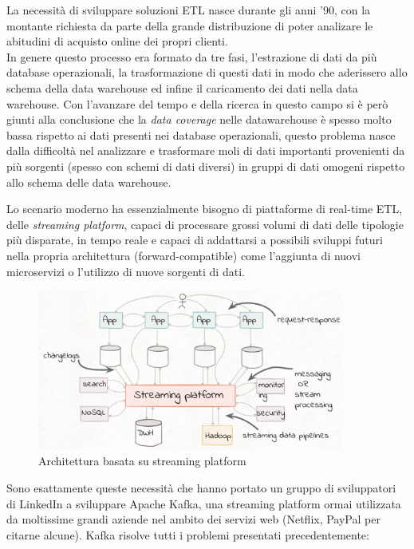\documentclass[]{article}
\begin{document}
La necessità di sviluppare soluzioni ETL nasce durante gli anni '90, con
la montante richiesta da parte della grande distribuzione di poter
analizare le abitudini di acquisto online dei propri clienti.\\
In genere questo processo era formato da tre fasi, l'estrazione di dati
da più database operazionali, la trasformazione di questi dati in modo
che aderissero allo schema della data warehouse ed infine il caricamento
dei dati nella data warehouse. Con l'avanzare del tempo e della ricerca
in questo campo si è però giunti alla conclusione che la \emph{data
coverage} nelle datawarehouse è spesso molto bassa rispetto ai dati
presenti nei database operazionali, questo problema nasce dalla
difficoltà nel analizzare e trasformare moli di dati importanti
provenienti da più sorgenti (spesso con schemi di dati diversi) in
gruppi di dati omogeni rispetto allo schema delle data warehouse.

Lo scenario moderno ha essenzialmente bisogno di piattaforme di
real-time ETL, delle \emph{streaming platform}, capaci di processare
grossi volumi di dati delle tipologie più disparate, in tempo reale e
capaci di addattarsi a possibili sviluppi futuri nella propria
architettura (forward-compatible) come l'aggiunta di nuovi microservizi
o l'utilizzo di nuove sorgenti di dati.

\begin{figure}
\centering
\includegraphics[width=0.90000\textwidth]{../images/streaming-platform.png}
\caption{Architettura basata su streaming platform \label{figure_5}}
\end{figure}

Sono esattamente queste necessità che hanno portato un gruppo di
sviluppatori di LinkedIn a sviluppare Apache Kafka, una streaming
platform ormai utilizzata da moltissime grandi aziende nel ambito dei
servizi web (Netflix, PayPal per citarne alcune). Kafka risolve tutti i
problemi presentati precedentemente:
\end{document}
